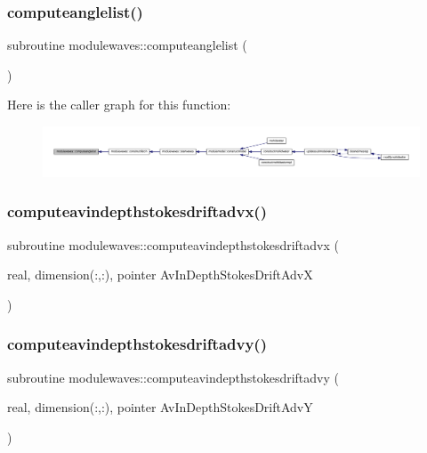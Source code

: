 \subsubsection{\texorpdfstring{computeanglelist()}{computeanglelist()}}
{\footnotesize\ttfamily subroutine modulewaves\+::computeanglelist (\begin{DoxyParamCaption}{ }\end{DoxyParamCaption})\hspace{0.3cm}{\ttfamily [private]}}

Here is the caller graph for this function\+:\nopagebreak
\begin{figure}[H]
\begin{center}
\leavevmode
\includegraphics[width=350pt]{namespacemodulewaves_a87b9e4a4fb336f9ea383004f7732a8e5_icgraph}
\end{center}
\end{figure}
\mbox{\label{namespacemodulewaves_a98626046a012cf7b692f0a35191e231e}} 
\subsubsection{\texorpdfstring{computeavindepthstokesdriftadvx()}{computeavindepthstokesdriftadvx()}}
{\footnotesize\ttfamily subroutine modulewaves\+::computeavindepthstokesdriftadvx (\begin{DoxyParamCaption}\item[{real, dimension(\+:,\+:), pointer}]{Av\+In\+Depth\+Stokes\+Drift\+AdvX }\end{DoxyParamCaption})\hspace{0.3cm}{\ttfamily [private]}}

\mbox{\label{namespacemodulewaves_a2c6ef8f51e579b38f56e8b4ec076f0aa}} 
\subsubsection{\texorpdfstring{computeavindepthstokesdriftadvy()}{computeavindepthstokesdriftadvy()}}
{\footnotesize\ttfamily subroutine modulewaves\+::computeavindepthstokesdriftadvy (\begin{DoxyParamCaption}\item[{real, dimension(\+:,\+:), pointer}]{Av\+In\+Depth\+Stokes\+Drift\+AdvY }\end{DoxyParamCaption})\hspace{0.3cm}{\ttfamily [private]}}

